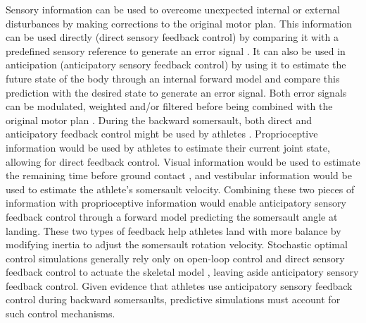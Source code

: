 \documentclass[10pt,letterpaper]{article}
\begin{document}
Sensory information can be used to overcome unexpected internal or external disturbances by making corrections to the original motor plan.
This information can be used directly (direct sensory feedback control) by comparing it with a predefined sensory reference to generate an error signal \cite{ghez2000organization}. 
It can also be used in anticipation (anticipatory sensory feedback control) by using it to estimate the future state of the body through an internal forward model \cite{desmurget2000forward} and compare this prediction with the desired state to generate an error signal.
Both error signals can be modulated, weighted and/or filtered before being combined with the original motor plan \cite{desmurget2000forward}.
During the backward somersault, both direct and anticipatory feedback control might be used by athletes \cite{bardy1998body}. 
Proprioceptive information would be used by athletes to estimate their current joint state, allowing for direct feedback control.
Visual information would be used to estimate the remaining time before ground contact \cite{bardy1998body}, and vestibular information would be used to estimate the athlete's somersault velocity.
Combining these two pieces of information with proprioceptive information would enable anticipatory sensory feedback control through a forward model predicting the somersault angle at landing.
These two types of feedback help athletes land with more balance by modifying inertia to adjust the somersault rotation velocity.
Stochastic optimal control simulations generally rely only on open-loop control and direct sensory feedback control to actuate the skeletal model \cite{van2022approximate, berret2024co}, leaving aside anticipatory sensory feedback control.
Given evidence that athletes use anticipatory sensory feedback control during backward somersaults, predictive simulations must account for such control mechanisms.

\end{document}
